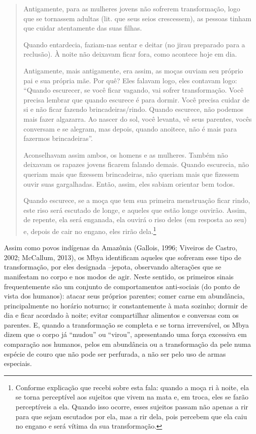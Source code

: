 \openright
\begin{quotation}
Antigamente, para as mulheres jovens não sofrerem transformação, logo
que se tornassem adultas (lit. que seus seios crescessem), as pessoas
tinham que cuidar atentamente das suas filhas. 

Quando entardecia, faziam-nas sentar e deitar (no jirau preparado para a
reclusão). À noite não deixavam ficar fora, como acontece hoje em dia. 


Antigamente, mais antigamente, era assim, as moças ouviam seu próprio
pai e sua própria mãe. Por quê? Eles falavam logo, eles contavam logo:
``Quando escurecer, se você ficar vagando, vai sofrer transformação.
Você precisa lembrar que quando escurece é para dormir. Você precisa
cuidar de si e não ficar fazendo brincadeiras/rindo. Quando escurece,
não podemos mais fazer algazarra. Ao nascer do sol, você levanta, vê
seus parentes, vocês conversam e se alegram, mas depois, quando
anoitece, não é mais para fazermos brincadeiras''. 

Aconselhavam assim ambos, os homens e as mulheres. Também não deixavam
os rapazes jovens ficarem falando demais. Quando escurecia, não queriam
mais que fizessem brincadeiras, não queriam mais que fizessem ouvir
suas gargalhadas. Então, assim, eles sabiam orientar bem todos. 

Quando escurece, se a moça que tem sua primeira menstruação ficar rindo,
este riso será escutado de longe, e aqueles que estão longe ouvirão.
Assim, de repente, ela será enganada, ela ouvirá o riso deles (em
resposta ao seu) e, depois de cair no engano, eles rirão
dela.\footnote{Conforme explicação que recebi sobre esta fala: quando a
moça ri à noite, ela se torna perceptível aos sujeitos que vivem na
mata e, em troca, eles se farão perceptíveis a ela. Quando isso ocorre,
esses sujeitos passam não apenas a rir para que sejam escutados por
ela, mas a rir dela, pois percebem que ela caiu no engano e será vítima
da sua transformação.}
\end{quotation}


Assim como povos indígenas da Amazônia (Gallois, 1996; Viveiros de
Castro, 2002; McCallum, 2013), os Mbya identificam aqueles que sofreram
esse tipo de transformação, por eles designada –jepota, observando
alterações que se manifestam no corpo e nos modos de agir. Neste
sentido, os primeiros sinais frequentemente são um conjunto de
comportamentos anti-sociais (do ponto de vista dos humanos): atacar
seus próprios parentes; comer carne em abundância, principalmente no
horário noturno; ir constantemente à mata sozinho; dormir de dia e
ficar acordado à noite; evitar compartilhar alimentos e conversas com
os parentes. E, quando a transformação se completa e se torna
irreversível, os Mbya dizem que o corpo já ``mudou'' ou ``virou'',
apresentando uma força excessiva em comparação aos humanos, pelos em
abundância ou a transformação da pele numa espécie de couro que não
pode ser perfurada, a não ser pelo uso de armas especiais. 

